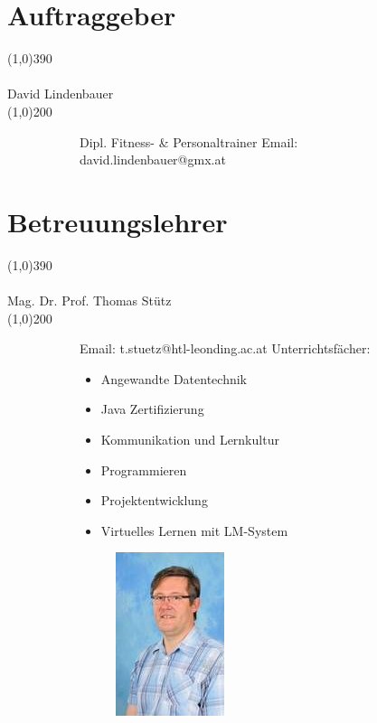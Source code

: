\documentclass[FIPLY_base.tex]{subfiles}
\begin{document}
	\section{Auftraggeber}
	\line(1,0){390}
	\ \\
	\ \\
	\newline\newline
	{\Large David Lindenbauer}
	\ \\
	\line(1,0){200}
	\begin{figure}[H]
		\begin{subfigure}[b]{\textwidth}
			Dipl. Fitness- \& Personaltrainer
			\newline\newline
			Email: david.lindenbauer@gmx.at
			\newline
		\end{subfigure}
	\end{figure}
	\section{Betreuungslehrer}
	\line(1,0){390}
	\ \\
	\ \\
	\newline\newline
	{\Large Mag. Dr. Prof. Thomas Stütz}
	\ \\
	\line(1,0){200}
	\begin{figure}[H]
		\begin{subfigure}[b]{0.6\textwidth}
			Email: t.stuetz@htl-leonding.ac.at
			\newline
			\newline
			Unterrichtsfächer:
			\begin{itemize}
				\item Angewandte Datentechnik 
				\item Java Zertifizierung 
				\item Kommunikation und Lernkultur 
				\item Programmieren 
				\item Projektentwicklung 
				\item Virtuelles Lernen mit LM-System
			\end{itemize}
		\end{subfigure}
		\begin{subfigure}[b]{0.6\textwidth}
			\begin{subfigure}[b]{0.2\textwidth}
				\includegraphics[scale=1]{img/stuetz}
			\end{subfigure}
		\end{subfigure}
	\end{figure}
\end{document}
